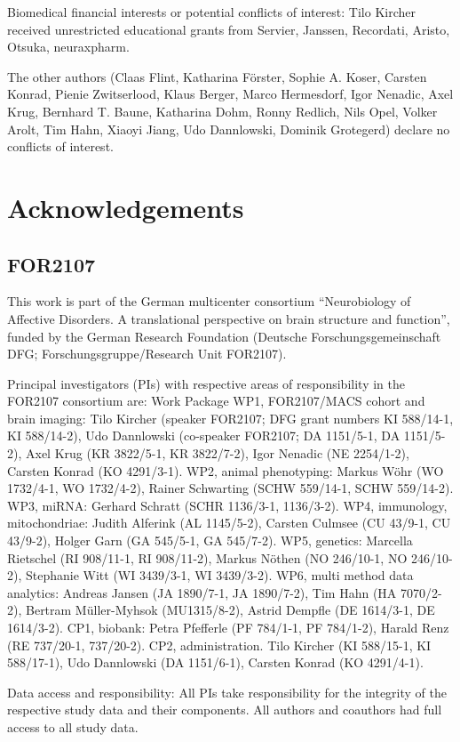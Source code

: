 \documentclass{article}
\begin{document}
    Biomedical financial interests or potential conflicts of interest: Tilo Kircher received unrestricted educational grants from Servier, Janssen, Recordati, Aristo, Otsuka, neuraxpharm.

    The other authors (Claas Flint, Katharina Förster, Sophie A. Koser, Carsten Konrad, Pienie Zwitserlood, Klaus Berger, Marco Hermesdorf, Igor Nenadic, Axel Krug, Bernhard T. Baune, Katharina Dohm, Ronny Redlich, Nils Opel, Volker Arolt, Tim Hahn, Xiaoyi Jiang, Udo Dannlowski, Dominik Grotegerd) declare no conflicts of interest.

    \section*{Acknowledgements}
    \subsection*{FOR2107}
    This work is part of the German multicenter consortium “Neurobiology of Affective Disorders. A translational perspective on brain structure and function”, funded by the German Research Foundation (Deutsche Forschungsgemeinschaft DFG; Forschungsgruppe/Research Unit FOR2107).

    Principal investigators (PIs) with respective areas of responsibility in the FOR2107 consortium are:
    Work Package WP1, FOR2107/MACS cohort and brain imaging: Tilo Kircher (speaker FOR2107; DFG grant numbers KI 588/14-1, KI 588/14-2), Udo Dannlowski (co-speaker FOR2107; DA 1151/5-1, DA 1151/5-2), Axel Krug (KR 3822/5-1, KR 3822/7-2), Igor Nenadic (NE 2254/1-2), Carsten Konrad (KO 4291/3-1). WP2, animal phenotyping: Markus Wöhr (WO 1732/4-1, WO 1732/4-2), Rainer Schwarting (SCHW 559/14-1, SCHW 559/14-2). WP3, miRNA: Gerhard Schratt (SCHR 1136/3-1, 1136/3-2). WP4, immunology, mitochondriae: Judith Alferink (AL 1145/5-2), Carsten Culmsee (CU 43/9-1, CU 43/9-2), Holger Garn (GA 545/5-1, GA 545/7-2). WP5, genetics: Marcella Rietschel (RI 908/11-1, RI 908/11-2), Markus Nöthen (NO 246/10-1, NO 246/10-2), Stephanie Witt (WI 3439/3-1, WI 3439/3-2). WP6, multi method data analytics: Andreas Jansen (JA 1890/7-1, JA 1890/7-2), Tim Hahn (HA 7070/2-2), Bertram Müller-Myhsok (MU1315/8-2), Astrid Dempfle (DE 1614/3-1, DE 1614/3-2). CP1, biobank: Petra Pfefferle (PF 784/1-1, PF 784/1-2), Harald Renz (RE 737/20-1, 737/20-2). CP2, administration. Tilo Kircher (KI 588/15-1, KI 588/17-1), Udo Dannlowski (DA 1151/6-1), Carsten Konrad (KO 4291/4-1).

    Data access and responsibility: All PIs take responsibility for the integrity of the respective study data and their components. All authors and coauthors had full access to all study data.
\end{document}
